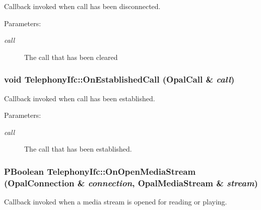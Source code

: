 Callback invoked when call has been disconnected. 

\begin{Desc}
\item[Parameters:]
\begin{description}
\item[{\em call}]The call that has been cleared \end{description}
\end{Desc}
\hypertarget{classTelephonyIfc_a482ebd5daf3bf5d69ec40a46a0616e9}{
\subsubsection[{OnEstablishedCall}]{\setlength{\rightskip}{0pt plus 5cm}void TelephonyIfc::OnEstablishedCall (OpalCall \& {\em call})}}
\label{classTelephonyIfc_a482ebd5daf3bf5d69ec40a46a0616e9}


Callback invoked when call has been established. 

\begin{Desc}
\item[Parameters:]
\begin{description}
\item[{\em call}]The call that has been established. \end{description}
\end{Desc}
\hypertarget{classTelephonyIfc_f3a2ff3766cf45c203dba5a2260445b1}{
\subsubsection[{OnOpenMediaStream}]{\setlength{\rightskip}{0pt plus 5cm}PBoolean TelephonyIfc::OnOpenMediaStream (OpalConnection \& {\em connection}, \/  OpalMediaStream \& {\em stream})}}
\label{classTelephonyIfc_f3a2ff3766cf45c203dba5a2260445b1}


Callback invoked when a media stream is opened for reading or playing. 

